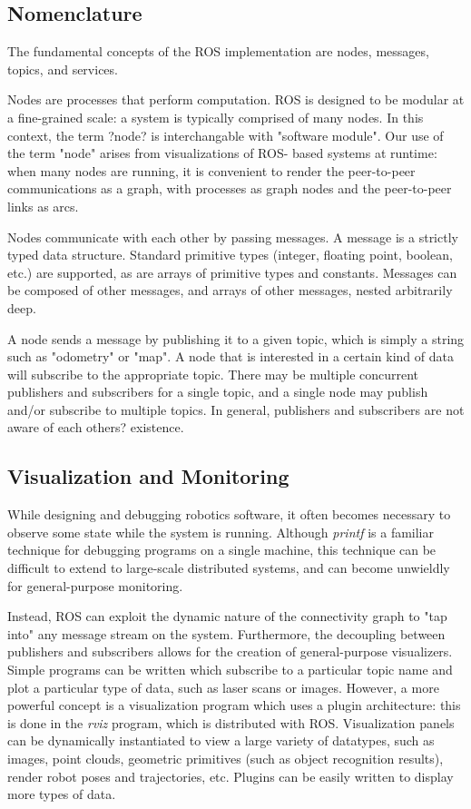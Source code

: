 \subsection{Nomenclature}

The fundamental concepts of the ROS implementation are nodes, messages, topics, and services.

Nodes are processes that perform computation. ROS is designed to be modular at a fine-grained scale: a system is typically comprised of many nodes. In this context, the term ?node? is interchangable with "software module". Our use of the term "node" arises from visualizations of ROS- based systems at runtime: when many nodes are running, it is convenient to render the peer-to-peer communications as a graph, with processes as graph nodes and the peer-to-peer links as arcs.

Nodes communicate with each other by passing messages. A message is a strictly typed data structure. Standard primitive types (integer, floating point, boolean, etc.) are supported, as are arrays of primitive types and constants. Messages can be composed of other messages, and arrays of other messages, nested arbitrarily deep.

A node sends a message by publishing it to a given topic, which is simply a string such as "odometry" or "map". A node that is interested in a certain kind of data will subscribe to the appropriate topic. There may be multiple concurrent publishers and subscribers for a single topic, and a single node may publish and/or subscribe to multiple topics. In general, publishers and subscribers are not aware of each others? existence.

\subsection{Visualization and Monitoring}

While designing and debugging robotics software, it often becomes necessary to observe some state while the system is running. Although \textit{printf} is a familiar technique for debugging programs on a single machine, this technique can be difficult to extend to large-scale distributed systems, and can become unwieldly for general-purpose monitoring.

Instead, ROS can exploit the dynamic nature of the connectivity graph to "tap into" any message stream on the system. Furthermore, the decoupling between publishers and subscribers allows for the creation of general-purpose visualizers. Simple programs can be written which subscribe to a particular topic name and plot a particular type of data, such as laser scans or images. However, a more powerful concept is a visualization program which uses a plugin architecture: this is done in the \textit{rviz} program, which is distributed with ROS. Visualization panels can be dynamically instantiated to view a large variety of datatypes, such as images, point clouds, geometric primitives (such as object recognition results), render robot poses and trajectories, etc. Plugins can be easily written to display more types of data.

